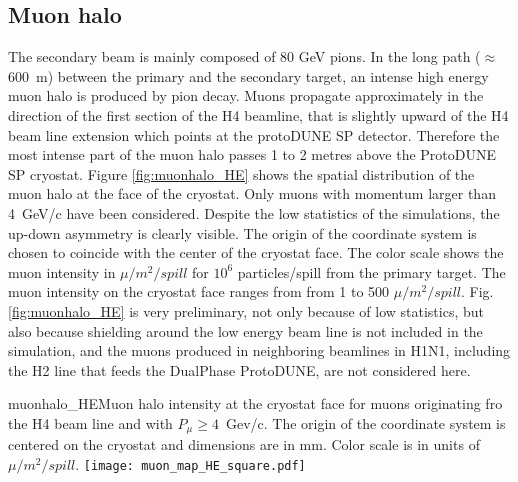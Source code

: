 \subsection{Muon halo}
The secondary beam is mainly composed of 80 GeV pions. In the long path ($\approx$ 600~m) between the primary and the secondary target,
 an intense high energy muon halo is produced by pion decay. Muons propagate approximately in the direction of the first section of the H4 beamline, 
 that is slightly upward of the H4 beam line extension which points at the protoDUNE SP detector.  
 Therefore the most intense part of the muon halo passes 1 to 2 metres above the ProtoDUNE SP cryostat. 
Figure \ref{fig:muonhalo_HE} shows the spatial distribution of the muon halo at the face of the cryostat. Only muons with momentum larger than 4~GeV/c have been considered. Despite the low statistics of the simulations, the up-down asymmetry is clearly visible. The origin of the coordinate system is chosen to coincide with the center of the cryostat face. The color scale shows the muon intensity in $\mu /m^2/spill$ for $10^6$ particles/spill from the primary target. The muon intensity on the cryostat face ranges from  from 1 to 500  $\mu /m^2/spill$.
Fig. \ref{fig:muonhalo_HE}  is very preliminary, not only because of low statistics, but also because shielding around the low energy beam line is not included in the simulation, and the muons produced in neighboring beamlines in H1N1, including the H2 line that feeds the DualPhase ProtoDUNE, are not considered here. 
\begin{cdrfigure}{muonhalo_HE}{Muon halo intensity at the cryostat face for muons originating fro the H4 beam line and with $P_\mu  \ge 4$~Gev/c. The origin of the coordinate system is centered on the cryostat and dimensions are in mm. Color scale is in units of $\mu /m^2/spill$.}
\texttt{[image: muon\_map\_HE\_square.pdf]}
\end{cdrfigure}




